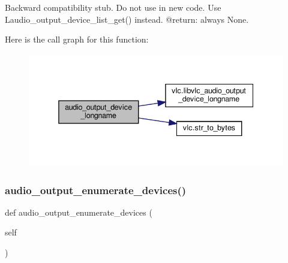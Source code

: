 \begin{DoxyVerb}Backward compatibility stub. Do not use in new code.
\deprecated Use L{audio_output_device_list_get}() instead.
@return: always None.
\end{DoxyVerb}
 Here is the call graph for this function\+:
\nopagebreak
\begin{figure}[H]
\begin{center}
\leavevmode
\includegraphics[width=338pt]{classvlc_1_1_instance_adb695b24e932f78c36dcca72806974e9_cgraph}
\end{center}
\end{figure}
\mbox{\label{classvlc_1_1_instance_a6fdfa4effb01d9a1ebfde60527f7508b}} 
\subsubsection{\texorpdfstring{audio\+\_\+output\+\_\+enumerate\+\_\+devices()}{audio\_output\_enumerate\_devices()}}
{\footnotesize\ttfamily def audio\+\_\+output\+\_\+enumerate\+\_\+devices (\begin{DoxyParamCaption}\item[{}]{self }\end{DoxyParamCaption})}

